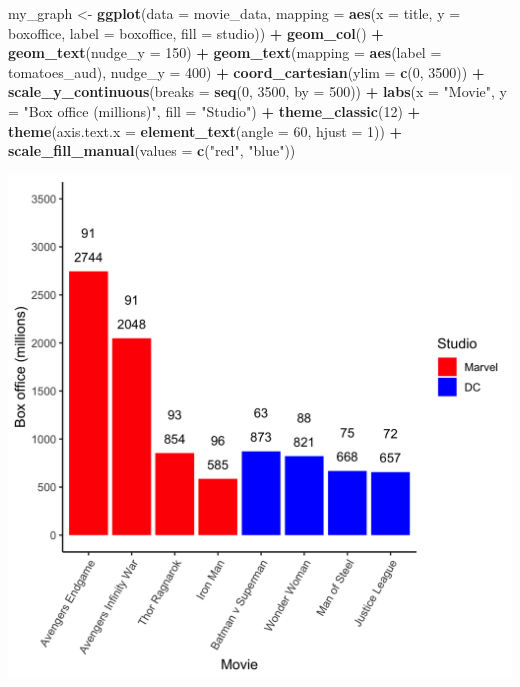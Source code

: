 \documentclass[
]{krantz}
\makeatletter
\newenvironment{Shaded}{\begin{snugshade}}{\end{snugshade}}
\newcommand{\DataTypeTok}[1]{\textcolor[rgb]{0.27,0.27,0.27}{#1}}
\newcommand{\DecValTok}[1]{\textcolor[rgb]{0.06,0.06,0.06}{#1}}
\newcommand{\KeywordTok}[1]{\textcolor[rgb]{0.27,0.27,0.27}{\textbf{#1}}}
\newcommand{\NormalTok}[1]{#1}
\newcommand{\OperatorTok}[1]{\textcolor[rgb]{0.43,0.43,0.43}{\textbf{#1}}}
\newcommand{\StringTok}[1]{\textcolor[rgb]{0.5,0.5,0.5}{#1}}
\newenvironment{kframe}{%
\medskip{}
\setlength{\fboxsep}{.8em}
 \def\at@end@of@kframe{}%
 \ifinner\ifhmode%
  \def\at@end@of@kframe{\end{minipage}}%
  \begin{minipage}{\columnwidth}%
 \fi\fi%
 \def\FrameCommand##1{\hskip\@totalleftmargin \hskip-\fboxsep
 \colorbox{shadecolor}{##1}\hskip-\fboxsep
     \hskip-\linewidth \hskip-\@totalleftmargin \hskip\columnwidth}%
 \MakeFramed {\advance\hsize-\width
   \@totalleftmargin\z@ \linewidth\hsize
   \@setminipage}}%
 {\par\unskip\endMakeFramed%
 \at@end@of@kframe}
\renewenvironment{Shaded}{\begin{kframe}}{\end{kframe}}
\makeatother
\begin{document}
\begin{Shaded}
\begin{Highlighting}[]
\NormalTok{my_graph <-}\StringTok{ }\KeywordTok{ggplot}\NormalTok{(}\DataTypeTok{data =}\NormalTok{ movie_data,}
           \DataTypeTok{mapping =} \KeywordTok{aes}\NormalTok{(}\DataTypeTok{x =}\NormalTok{ title,}
                         \DataTypeTok{y =}\NormalTok{ boxoffice,}
                         \DataTypeTok{label =}\NormalTok{ boxoffice, }
                         \DataTypeTok{fill =}\NormalTok{ studio)) }\OperatorTok{+}
\StringTok{  }\KeywordTok{geom_col}\NormalTok{() }\OperatorTok{+}
\StringTok{  }\KeywordTok{geom_text}\NormalTok{(}\DataTypeTok{nudge_y =} \DecValTok{150}\NormalTok{)  }\OperatorTok{+}
\StringTok{  }\KeywordTok{geom_text}\NormalTok{(}\DataTypeTok{mapping =} \KeywordTok{aes}\NormalTok{(}\DataTypeTok{label =}\NormalTok{ tomatoes_aud), }
            \DataTypeTok{nudge_y =} \DecValTok{400}\NormalTok{) }\OperatorTok{+}
\StringTok{  }\KeywordTok{coord_cartesian}\NormalTok{(}\DataTypeTok{ylim =} \KeywordTok{c}\NormalTok{(}\DecValTok{0}\NormalTok{, }\DecValTok{3500}\NormalTok{)) }\OperatorTok{+}
\StringTok{  }\KeywordTok{scale_y_continuous}\NormalTok{(}\DataTypeTok{breaks =} \KeywordTok{seq}\NormalTok{(}\DecValTok{0}\NormalTok{, }\DecValTok{3500}\NormalTok{, }\DataTypeTok{by =} \DecValTok{500}\NormalTok{)) }\OperatorTok{+}
\StringTok{  }\KeywordTok{labs}\NormalTok{(}\DataTypeTok{x =} \StringTok{"Movie"}\NormalTok{,}
       \DataTypeTok{y =} \StringTok{"Box office (millions)"}\NormalTok{,}
       \DataTypeTok{fill =} \StringTok{"Studio"}\NormalTok{) }\OperatorTok{+}
\StringTok{  }\KeywordTok{theme_classic}\NormalTok{(}\DecValTok{12}\NormalTok{) }\OperatorTok{+}
\StringTok{  }\KeywordTok{theme}\NormalTok{(}\DataTypeTok{axis.text.x =} \KeywordTok{element_text}\NormalTok{(}\DataTypeTok{angle =} \DecValTok{60}\NormalTok{, }
                                   \DataTypeTok{hjust =} \DecValTok{1}\NormalTok{)) }\OperatorTok{+}
\StringTok{  }\KeywordTok{scale_fill_manual}\NormalTok{(}\DataTypeTok{values =} \KeywordTok{c}\NormalTok{(}\StringTok{"red"}\NormalTok{, }\StringTok{"blue"}\NormalTok{))}
\end{Highlighting}
\end{Shaded}

\includegraphics[width=0.65\linewidth]{ch_graphing/images/base_color_graph}
\end{document}
